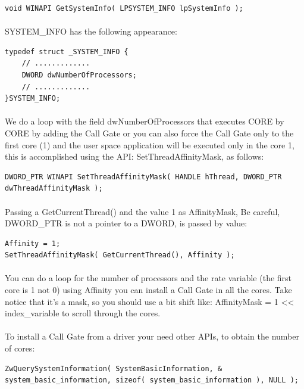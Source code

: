 \documentclass[12pt,a4paper,english]{book}
\newcommand{\paraph}{\paragraph{}}
\begin{document}
\lstset{language=C,caption=API to get the system info}
\begin{lstlisting}
void WINAPI GetSystemInfo( LPSYSTEM_INFO lpSystemInfo );
\end{lstlisting}

\paraph{}
SYSTEM\_INFO has the following appearance:

\lstset{language=C,caption=SYSTEM INFO structure}
\begin{lstlisting}
typedef struct _SYSTEM_INFO {
    // .............
    DWORD dwNumberOfProcessors;
    // .............
}SYSTEM_INFO;
\end{lstlisting}

\paraph{}
We do a loop with the field dwNumberOfProcessors that executes CORE by CORE by adding the Call Gate or you can also force the Call Gate only to the first core (1) and the user space application will be executed only in the core 1, this is accomplished using the API: SetThreadAffinityMask, as follows:

\lstset{language=C,caption=SetThreadAffinityMask API}
\begin{lstlisting}
DWORD_PTR WINAPI SetThreadAffinityMask( HANDLE hThread, DWORD_PTR dwThreadAffinityMask );
\end{lstlisting}

\paraph{}
Passing a GetCurrentThread() and the value 1 as AffinityMask, Be careful, DWORD\_PTR is not a pointer to a DWORD, is passed by value:

\lstset{language=C,caption=SetThreadAffinityMask to core 1}
\begin{lstlisting}
Affinity = 1;
SetThreadAffinityMask( GetCurrentThread(), Affinity );
\end{lstlisting}

\paraph{}
You can do a loop for the number of processors and the rate variable (the first core is 1 not 0) using Affinity you can install a Call Gate in all the cores. Take notice that it's a mask, so you should use a bit shift like: AffinityMask = 1 << index\_variable to scroll through the cores.

\paraph{}
To install a Call Gate from a driver your need other APIs, to obtain the number of cores:

\lstset{language=C,caption=Get the number of cores from a driver}
\begin{lstlisting}
ZwQuerySystemInformation( SystemBasicInformation, & system_basic_information, sizeof( system_basic_information ), NULL );
\end{lstlisting}
\end{document}
